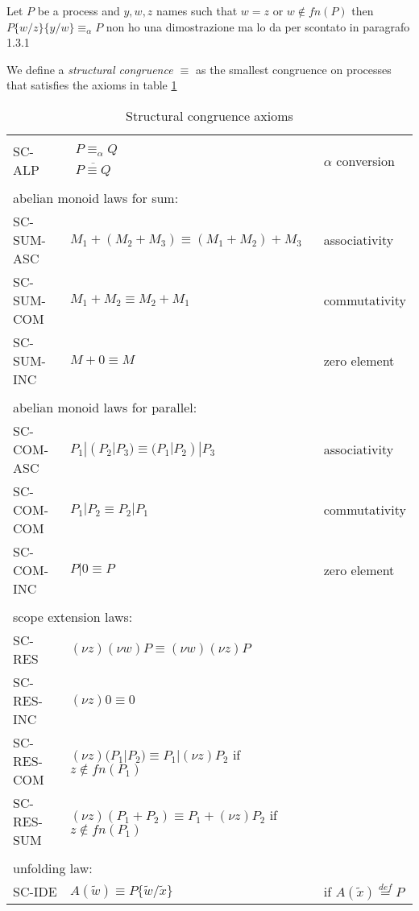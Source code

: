 \begin{lemma}
  Let $P$ be a process and $y,w,z$ names such that $w=z$ or $w\notin fn(P)$ then $P\{w/z\}\{y/w\}\equiv_{\alpha}P$
non ho una dimostrazione ma lo da per scontato in \cite{milnerparrowwalker} paragrafo 1.3.1
\end{lemma}



\begin{definition}
  We define a \emph{structural congruence $\equiv$} as the smallest congruence on processes that satisfies the axioms in table \ref{structuralcongrunce}
  \begin{table}
    \begin{tabular}{lll}
      \hline\\
	SC-ALP&$\begin{array}{c}P \equiv_{\alpha} Q\\\overline{P\equiv Q}\end{array}$&$\alpha$ conversion
      \\\\
	\multicolumn{3}{l}{abelian monoid laws for sum:}
      \\
	SC-SUM-ASC& $M_{1}+(M_{2}+M_{3})\equiv (M_{1}+M_{2})+M_{3}$ &associativity
      \\
	SC-SUM-COM& $M_{1}+M_{2}\equiv M_{2}+M_{1}$ &commutativity
      \\
	SC-SUM-INC& $M+0\equiv M$&zero element
      \\\\
	\multicolumn{3}{l}{abelian monoid laws for parallel:}
      \\
	SC-COM-ASC& $P_{1}|(P_{2}|P_{3})\equiv (P_{1}|P_{2})|P_{3}$ &associativity
      \\
	SC-COM-COM& $P_{1}|P_{2}\equiv P_{2}|P_{1}$ &commutativity
      \\
	SC-COM-INC& $P|0\equiv P$&zero element
      \\\\
	\multicolumn{3}{l}{scope extension laws:}
      \\
	SC-RES& $(\nu z) (\nu w) P \equiv (\nu w) (\nu z) P$ &
      \\
	SC-RES-INC& $(\nu z) 0 \equiv 0$ &
      \\
	SC-RES-COM& $(\nu z) (P_{1}|P_{2}) \equiv P_{1}|(\nu z) P_{2}$ if $z\notin fn(P_{1})$&
      \\
	SC-RES-SUM& $(\nu z) (P_{1}+P_{2}) \equiv P_{1}+(\nu z) P_{2}$ if $z\notin fn(P_{1})$&
      \\\\
	\multicolumn{3}{l}{unfolding law:}
      \\
	SC-IDE&$A(\tilde{w})\equiv P\{\tilde{w}/\tilde{x}\}$&if $A(\tilde{x})\stackrel{def}{=}P$
      \\\hline
    \end{tabular}
    \caption{Structural congruence axioms}
    \label{structuralcongrunce}
  \end{table}
\end{definition}

